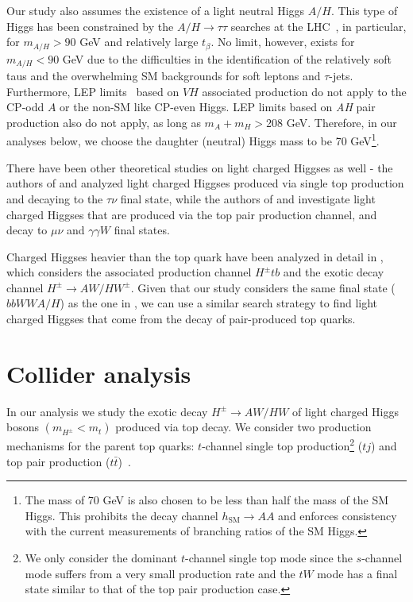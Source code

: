 Our study also assumes the existence of a light neutral Higgs $A/H$. This type of Higgs has been constrained by the $A/H \rightarrow \tau\tau$ searches at the LHC~\cite{Khachatryan:2014wca,Aad:2014vgg}, in particular, for $m_{A/H}>90$ GeV and relatively large $t_{\beta}$. No limit, however, exists for $m_{A/H}<90$ GeV due to the difficulties in the identification of the relatively soft taus and the overwhelming SM backgrounds for soft leptons and $\tau$-jets. Furthermore, LEP limits~\cite{LEP_Higgs} based on $VH$ associated production do not apply to the CP-odd $A$ or the non-SM like CP-even Higgs. LEP limits based on \emph{AH} pair production also do not apply, as long as $m_A+m_H>$208 GeV. Therefore, in our analyses below, we choose the daughter (neutral) Higgs mass to be 70 GeV\footnote{The mass of 70 GeV is also chosen to be less than half the mass of the SM Higgs. This prohibits the decay channel $h_\text{SM} \rightarrow AA$ and enforces consistency with the current measurements of branching ratios of the SM Higgs.}.

There have been other theoretical studies on light charged Higgses as well - the authors of \cite{Guedes:2012eu} and \cite{Hashemi:2013kga} analyzed light charged Higgses produced via single top production and decaying to the $\tau\nu$ final state, while the authors of \cite{Hashemi:2011gy} and \cite{Das:2014fha} investigate light charged Higgses that are produced via the top pair production channel, and decay to $\mu\nu$ and $\gamma\gamma W$ final states. 

Charged Higgses heavier than the top quark have been analyzed in detail in \cite{Coleppa:2014cca}, which considers the associated production channel $H^{\pm} tb$ and the exotic decay channel $H^{\pm}\rightarrow AW/HW^{\pm}$. Given that our study considers the same final state ($bbWWA/H$) as the one in \cite{Coleppa:2014cca}, we can use a similar search strategy to find light charged Higgses that come from the decay of pair-produced top quarks.

\section{Collider analysis}\label{sec:light_charged_analysis}

In our analysis we study the exotic decay $H^{\pm} \rightarrow AW/HW$ of light charged Higgs bosons $(m_{H^{\pm}}<m_t)$ produced via top decay. We consider two production mechanisms for the parent top quarks: $t$-channel single top production\footnote{We only consider the dominant $t$-channel single top mode since the $s$-channel mode suffers from a very small production rate and the $tW$ mode has a final state similar to that of the top pair production case.} ($tj$) and top pair production ($t\bar{t}$)~\cite{Kidonakis:2012db}.


